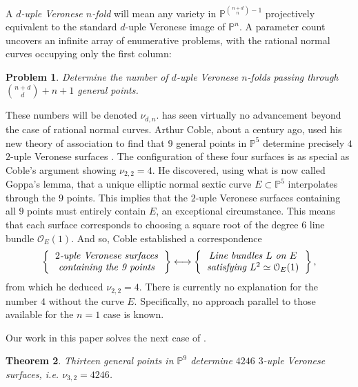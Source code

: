 \documentclass[reqno, 11pt]{amsart}
\theoremstyle{plain}
\newtheorem{theorem}{Theorem}[section]
\newtheorem{problem}[theorem]{Problem}
\theoremstyle{remark}
\renewcommand{\P}{\mathbb{P}}
\renewcommand{\O}{\mathcal{O}}
\begin{document}
A {\sl $d$-uple Veronese $n$-fold} will mean any
variety in $\P^{{n+d \choose n}-1}$ projectively equivalent to the
standard $d$-uple Veronese image of $\P^n$. A parameter count 
uncovers an infinite array of enumerative problems, with the rational normal curves occupying only the first column: 
\begin{problem}
    \label{problem:main}
Determine the number of $d$-uple Veronese $n$-folds passing through ${n+d \choose d}+n+1$ general points.
\end{problem}
These numbers will be denoted $\nu_{d,n}$.   has seen virtually no advancement beyond the case of rational normal curves.  Arthur Coble, about a century ago, used his new theory of association to find that $9$ general points in $\P^5$ determine precisely $4$ $2$-uple Veronese surfaces \cite[~Theorem 19]{CobleAssociatedSO}.  The configuration of these four surfaces is as special as Coble's argument showing $\nu_{2,2}=4$. He discovered, using what is now called Goppa's lemma, that a unique elliptic normal sextic curve $E \subset \P^{5}$ interpolates through the $9$ points. This implies that the $2$-uple Veronese surfaces containing all $9$ points must entirely contain $E$, an exceptional circumstance. This means that each surface corresponds to choosing a square root of the degree $6$ line bundle $\O_{E}(1)$.  And so, Coble established a correspondence 
\begin{align}
\label{Coblecorrespondence}
\left\{ \begin{tabular}{c}
    \emph{$2$-uple Veronese surfaces} \\
     \emph{containing the 9 points} 
\end{tabular} \right\} \longleftrightarrow \left\{ \begin{tabular}{c}
    \emph{Line bundles $L$ on $E$} \\
     \emph{satisfying $L^{2} \simeq \O_{E}(1)$} 
\end{tabular} \right\},\end{align}  from which he  deduced $\nu_{2,2}=4$. 
There is currently no explanation for the number $4$ without the curve $E$. Specifically, no approach parallel to those available for the $n=1$ case is known.

 Our work in this paper solves the next case of . 

\begin{theorem}
\label{theorem:main}  Thirteen general points in $\P^{9}$ determine $4246$ $3$-uple Veronese surfaces, i.e. $\nu_{3,2} = 4246$.
\end{theorem}
\end{document}
